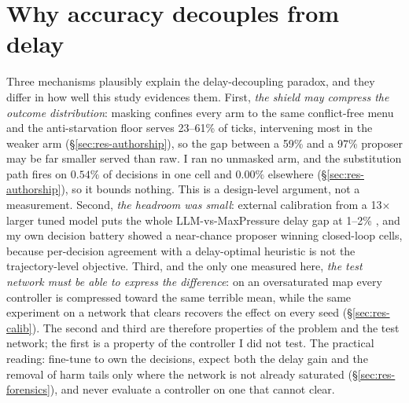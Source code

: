 \section{Why accuracy decouples from delay}\label{sec:dis-decoupling}
Three mechanisms plausibly explain the delay-decoupling paradox, and they
differ in how well this study evidences them. First, \emph{the shield may
compress the outcome distribution}: masking confines every arm to the same
conflict-free menu and the anti-starvation floor serves 23--61\% of ticks,
intervening most in the weaker arm (\S\ref{sec:res-authorship}), so the gap between a 59\% and a 97\% proposer may be
far smaller served than raw. I ran no unmasked arm, and the substitution
path fires on $0.54\%$ of decisions in one cell and $0.00\%$ elsewhere
(\S\ref{sec:res-authorship}), so it bounds nothing. This is a design-level
argument, not a measurement. Second, \emph{the headroom was small}: external
calibration from a 13$\times$ larger tuned model puts the whole
LLM-vs-MaxPressure delay gap at 1--2\% \cite{dglight2026}, and my own
decision battery showed a near-chance proposer winning closed-loop
cells, because per-decision agreement with a delay-optimal heuristic is
not the trajectory-level objective. Third, and the only one measured here, \emph{the test network
must be able to express the difference}: on an oversaturated map every
controller is compressed toward the same terrible mean, while the same
experiment on a network that clears recovers the effect on every seed
(\S\ref{sec:res-calib}). The second and third are therefore properties of
the problem and the test network; the first is a property of the
controller I did not test. The practical reading: fine-tune to own the
decisions, expect both the delay gain and the removal of harm tails only
where the network is not already saturated (\S\ref{sec:res-forensics}),
and never evaluate a controller on one that cannot clear.
